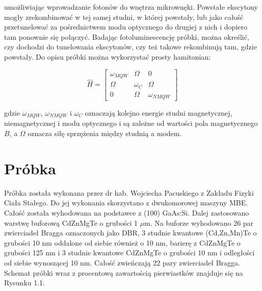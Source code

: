 \documentclass[licencjacka]{pracamgr}
\begin{document}
umożliwiając wprowadzanie fotonów do wnętrza mikrownęki. Powstałe ekscytony mogły zrekombinować w tej samej studni, w której powstały, lub jako całość przetunelować za pośrednictwem modu optycznego do drugiej z nich i dopiero tam ponownie się połączyć. Badając fotoluminescencję próbki, można określić, czy dochodzi do tunelowania ekscytonów, czy też takowe rekombinują tam, gdzie powstały. Do opisu próbki można wykorzystać prosty hamitonian:

\begin{equation}
\hat{H}=
\begin{bmatrix}
\omega_{MQW} & \Omega &0 \\
\Omega & \omega_{C} & \Omega \\
0 & \Omega & \omega_{NMQW}
\end{bmatrix}  
\end{equation}

gdzie $\omega_{MQW}$, $\omega_{NMQW}$ i $\omega_{C}$ oznaczają kolejno energie studni magnetycznej, niemagnetycznej i modu optycznego i są zależne od wartości pola magnetycznego $B$, a $\Omega$ oznacza siłę sprzężenia między studnią a modem. %

\chapter{Próbka}\label{r:probka}
Próbka została wykonana przez dr hab. Wojciecha Pacuskiego z Zakładu Fizyki Ciała Stałego. Do jej wykonania skorzystano z dwukomorowej maszyny MBE. Całość została wyhodowana na podstawce z (100) GaAs:Si. Dalej zastosowano warstwę buforową CdZnMgTe o grubości 1 $\mu$m. Na buforze wyhodowano 26 par zwierciadeł Bragga oznaczonych jako DBR, 3 studnie kwantowe (Cd,Zn,Mn)Te o grubości 10 nm oddalone od siebie również o 10 nm, barierę z CdZnMgTe o grubości 125 nm i 3 studnie kwantowe CdZnMgTe o grubości 10 nm i odległości od siebie wynoszącej 10 nm. Całość zwieńczają 22 pary zwierciadeł Bragga. Schemat próbki wraz z procentową zawartością pierwiastków znajduje się na Rysunku 1.1.
\end{document}
